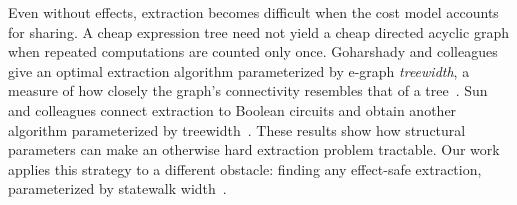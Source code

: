 Even without effects, extraction becomes difficult when the cost model accounts for sharing.
A cheap expression tree need not yield a cheap directed acyclic graph
  when repeated computations are counted only once.
Goharshady and colleagues give an optimal extraction algorithm
  parameterized by e-graph \emph{treewidth}, a measure of how closely
  the graph's connectivity resembles that of a tree~\cite{goharshady}.
Sun and colleagues connect extraction to Boolean circuits
  and obtain another algorithm parameterized by treewidth~\cite{glenn-treewidth}.
These results show how structural parameters can make an otherwise hard extraction problem tractable.
Our work applies this strategy to a different obstacle:
  finding any effect-safe extraction, parameterized by statewalk width~\cite{eggcc}.
